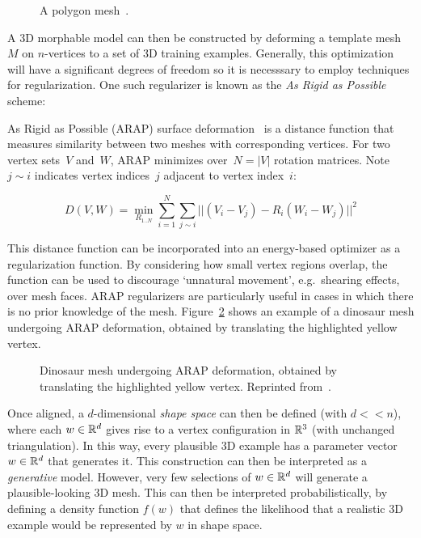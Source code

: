 \begin{figure}[t] %
    \caption{A polygon mesh~\cite{polygon_mesh}.}
    \label{fig:polygon_mesh}
\end{figure}

A 3D morphable model can then be constructed by deforming a template mesh $M$ on $n$-vertices to a set of 3D training examples. Generally, this optimization will have a significant degrees of freedom so it is necesssary to employ techniques for regularization. One such regularizer is known as the \emph{As Rigid as Possible} scheme: 

\begin{definition}
As Rigid as Possible (ARAP) surface deformation~\cite{sorkine2007rigid} is a distance function that measures similarity between two meshes with corresponding vertices. For two vertex sets~$V$ and~$W$, ARAP minimizes over~$N = |V|$ rotation matrices. Note~$j \sim i$ indicates vertex indices~$j$ adjacent to vertex index~$i$:

\begin{equation}
    D(V, W) = \min_{R_{1..N}}\sum_{i=1}^{N}\sum_{j \sim i}|| (V_{i} - V_{j}) - R_{i}(W_{i} - W_{j}) ||^{2}
\end{equation}

This distance function can be incorporated into an energy-based optimizer as a regularization function. By considering how small vertex regions overlap, the function can be used to  discourage `unnatural movement', e.g.\ shearing effects, over mesh faces. ARAP regularizers are particularly useful in cases in which there is no prior knowledge of the mesh. Figure~\ref{fig:arap_dino} shows an example of a dinosaur mesh undergoing ARAP deformation, obtained by translating the highlighted yellow vertex.

\begin{figure}[t] %
    \caption{Dinosaur mesh undergoing ARAP deformation, obtained by translating the highlighted yellow vertex. Reprinted from~\cite{sorkine2007rigid}.}
    \label{fig:arap_dino}
\end{figure}      

\end{definition}

Once aligned, a $d$-dimensional \emph{shape space} can then be defined (with $d << n$), where each $w \in {\mathbb{R}^{d}}$ gives rise to a vertex configuration in ${\mathbb{R}^{3}}$ (with unchanged triangulation). In this way, every plausible 3D example has a parameter vector $w \in {\mathbb{R}^{d}}$ that generates it. This construction can then be interpreted as a \emph{generative} model. However, very few selections of $w \in {\mathbb{R}^{d}}$ will generate a plausible-looking 3D mesh. This can then be interpreted probabilistically, by defining a density function $f(w)$ that defines the likelihood that a realistic 3D example would be represented by $w$ in shape space. 

